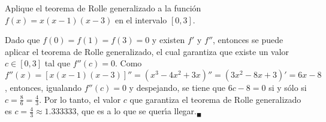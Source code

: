 \begin{enunciado}
 Aplique el teorema de Rolle generalizado a la funci\'on $f(x) = x(x-1)(x-3)$ en el intervalo $[0,3]$.
\end{enunciado}

\begin{solucion}
 Dado que $f(0)=f(1)=f(3)=0$ y existen $f'$ y $f''$, entonces se puede aplicar el teorema de Rolle generalizado, el cual garantiza que existe un valor $c \in [0,3]$ tal que $f''(c)=0$. Como $f''(x) = \left[x(x-1)(x-3)\right]'' = \left( x^3-4x^2+3x \right)'' = \left( 3x^2 - 8x + 3 \right)' = 6x - 8$, entonces, igualando $f''(c) = 0$ y despejando, se tiene que $6c - 8 = 0$ si y s\'olo si $c = \frac{8}{6} = \frac{4}{3}$. Por lo tanto, el valor $c$ que garantiza el teorema de Rolle generalizado es $c = \frac{4}{3} \approx 1.333333$, que es a lo que se quer\'{\i}a llegar.${}_{\blacksquare}$
\end{solucion}

